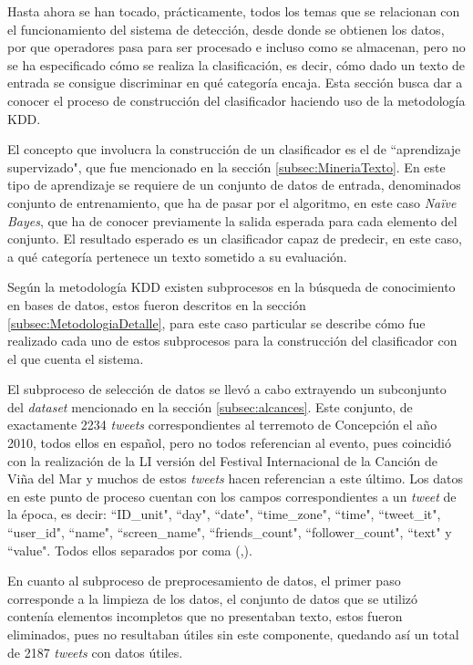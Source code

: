 Hasta ahora se han tocado, prácticamente, todos los temas que se relacionan con el funcionamiento del sistema de detección, desde donde se obtienen los datos, por que operadores pasa para ser procesado e incluso como se almacenan, pero no se ha especificado cómo se realiza la clasificación, es decir, cómo dado un texto de entrada se consigue discriminar en qué categoría encaja. Esta sección busca dar a conocer el proceso de construcción del clasificador haciendo uso de la metodología KDD.
	
El concepto que involucra la construcción de un clasificador es el de ``aprendizaje supervizado", que fue mencionado en la sección \ref{subsec:MineriaTexto}. En este tipo de aprendizaje se requiere de un conjunto de datos de entrada, denominados conjunto de entrenamiento, que ha de pasar por el algoritmo, en este caso \textit{Naïve Bayes}, que ha de conocer previamente la salida esperada para cada elemento del conjunto. El resultado esperado es un clasificador capaz de predecir, en este caso, a qué categoría pertenece un texto sometido a su evaluación.

Según la metodología KDD existen subprocesos en la búsqueda de conocimiento en bases de datos, estos fueron descritos en la sección \ref{subsec:MetodologiaDetalle}, para este caso particular se describe cómo fue realizado cada uno de estos subprocesos para la construcción del clasificador con el que cuenta el sistema.

El subproceso de selección de datos se llevó a cabo extrayendo un subconjunto del \textit{dataset} mencionado en la sección \ref{subsec:alcances}. Este conjunto, de exactamente 2234 \textit{tweets} correspondientes al terremoto de Concepción el año 2010, todos ellos en español, pero no todos referencian al evento, pues coincidió con la realización de la LI versión del Festival Internacional de la Canción de Viña del Mar y muchos de estos \textit{tweets} hacen referencian a este último. Los datos en este punto de proceso cuentan con los campos correspondientes a un \textit{tweet} de la época, es decir: ``ID\_unit", ``day", ``date", ``time\_zone", ``time", ``tweet\_it", ``user\_id", ``name", ``screen\_name", ``friends\_count", ``follower\_count", ``text" y ``value". Todos ellos separados por coma (,).

En cuanto al subproceso de preprocesamiento de datos, el primer paso corresponde a la limpieza de los datos, el conjunto de datos que se utilizó contenía elementos incompletos que no presentaban texto, estos fueron eliminados, pues no resultaban útiles sin este componente, quedando así un total de 2187 \textit{tweets} con datos útiles.

